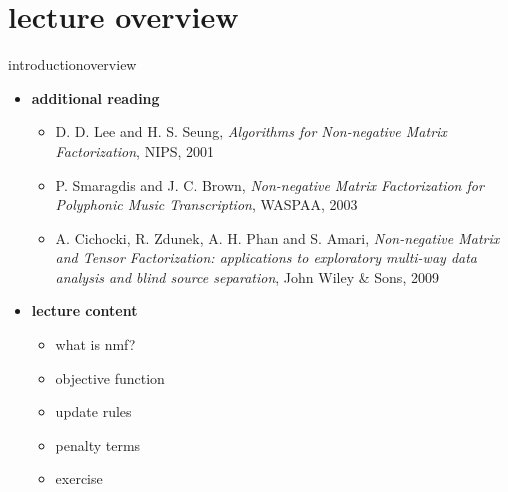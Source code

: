 

\subtitle{Part 6.4: amendment: Introduction to NMF}


	

    \section[overview]{lecture overview}
        \begin{frame}{introduction}{overview}
            \begin{itemize}
                \item   \textbf{additional reading}  
                    \begin{itemize}
                        \item   D. D. Lee and H. S. Seung, \textit{Algorithms for Non-negative Matrix Factorization}, NIPS, 2001
                        \item   P. Smaragdis and J. C. Brown, \textit{Non-negative Matrix Factorization for Polyphonic Music Transcription}, WASPAA, 2003
                        \item   A. Cichocki, R. Zdunek, A. H. Phan and S. Amari, \textit{Non-negative Matrix and Tensor Factorization: applications to exploratory multi-way data analysis and blind source separation}, John Wiley \& Sons, 2009
                    \end{itemize}
                \bigskip
                \item<2->   \textbf{lecture content}
                    \begin{itemize}
                        \item   what is nmf?
                        \item   objective function
                        \item   update rules
                        \item   penalty terms
                        \item   exercise
                    \end{itemize}
            \end{itemize}
        \end{frame}
   
